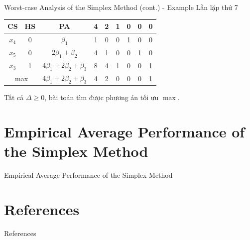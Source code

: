 \documentclass[10pt]{beamer}
\begin{document}
\begin{frame}{Worst-case Analysis of the Simplex Method (cont.) - Example}
Lần lặp thứ 7
\begin{table}[H]
\centering
\begin{tabular}{|c|c|c|c|c|c|c|c|c|}
\hline
CS & HS & PA & 4 & 2 & 1 & 0 & 0 & 0 \\
\hline
$x_4$ & 0 & $\beta_1$ & 1 & 0 & 0 & 1 & 0 & 0 \\
$x_5$ & 0 & $2\beta_1 + \beta_2$ & 4 & 1 & 0 & 0 & 1 & 0 \\
$x_3$ & 1 & $4\beta_1 + 2\beta_2 + \beta_3$ & 8 & 4 & 1 & 0 & 0 & 1 \\
\hline
\multicolumn{2}{|c|}{max}
&  $4\beta_1 + 2\beta_2 + \beta_3$  & 4 & 2 & 0 & 0 & 0 & 1 \\
\hline
\end{tabular}
\end{table}
Tất cả $\Delta \ge 0$, bài toán tìm được phương án tối ưu $\max$.
\end{frame}


\section{Empirical Average Performance of the Simplex Method}
\begin{frame}{Empirical Average Performance of the Simplex Method}

\end{frame}

\section{References}
\begin{frame}[allowframebreaks]{References}
\printbibliography
\end{frame}
\end{document}
